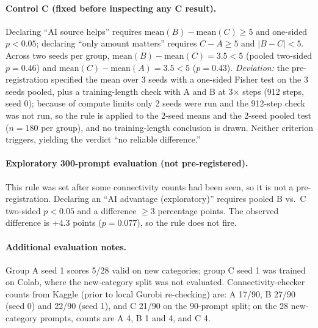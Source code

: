 \documentclass{article}
\begin{document}
\paragraph{Control C (fixed before inspecting any C result).} Declaring ``AI source helps'' requires $\text{mean}(B) - \text{mean}(C) \ge 5$ and one-sided $p<0.05$; declaring ``only amount matters'' requires $C - A \ge 5$ and $|B-C|<5$. Across two seeds per group, $\text{mean}(B) - \text{mean}(C) = 3.5 < 5$ (pooled two-sided $p=0.46$) and $\text{mean}(C) - \text{mean}(A) = 3.5 < 5$ ($p=0.43$). \emph{Deviation:} the pre-registration specified the mean over 3 seeds with a one-sided Fisher test on the 3 seeds pooled, plus a training-length check with A and B at 3$\times$ steps (912 steps, seed 0); because of compute limits only 2 seeds were run and the 912-step check was not run, so the rule is applied to the 2-seed means and the 2-seed pooled test ($n=180$ per group), and no training-length conclusion is drawn. Neither criterion triggers, yielding the verdict ``no reliable difference.''

\paragraph{Exploratory 300-prompt evaluation (not pre-registered).} This rule was set after some connectivity counts had been seen, so it is not a pre-registration. Declaring an ``AI advantage (exploratory)'' requires pooled B vs.\ C two-sided $p<0.05$ and a difference $\ge 3$ percentage points. The observed difference is $+4.3$ points ($p=0.077$), so the rule does not fire.

\paragraph{Additional evaluation notes.} Group A seed 1 scores 5/28 valid on new categories; group C seed 1 was trained on Colab, where the new-category split was not evaluated. Connectivity-checker counts from Kaggle (prior to local Gurobi re-checking) are: A 17/90, B 27/90 (seed 0) and 22/90 (seed 1), and C 21/90 on the 90-prompt split; on the 28 new-category prompts, counts are A 4, B 1 and 4, and C 4.
\end{document}
